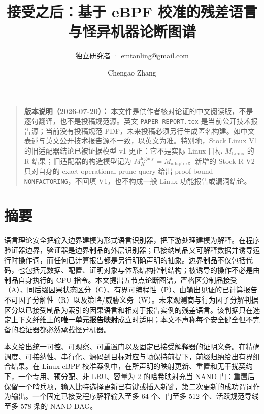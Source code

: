\documentclass[
  11pt,
  a4paper,
]{ctexart}
\title{接受之后：基于 eBPF 校准的残差语言与怪异机器论断图谱}
\subtitle{独立研究者 · emtanling@gmail.com}
\author{Chengao Zhang}
\date{}
\begin{document}
\maketitle
{}

\begin{quote}
\textbf{版本说明（2026-07-20）：}
本文件是供作者核对论证的中文阅读版，不是逐句翻译，也不是投稿规范源。英文
\texttt{PAPER\_REPORT.tex} 是当前公开技术报告源；当前没有投稿规范
PDF，未来投稿必须另行生成匿名构建。如中文表述与英文公开技术报告源不一致，以英文为准。特别地，Stock
Linux V1 的旧适配器结论已被证据模型 v1 更正：它不是实际 Linux 目标
\(M_{\mathrm{Linux}}\) 的 R 结果；旧适配器的构造模型记为
\(M_K^{\mathrm{legacy}}=M_{\mathrm{adapter}}\)。新增的 Stock-R V2
只对自身的 exact operational-prune query 给出 proof-bound
\texttt{NONFACTORING}，不回填 V1，也不构成一般 Linux
功能报告或漏洞结论。
\end{quote}

\hypertarget{ux6458ux8981}{%
\section{摘要}\label{ux6458ux8981}}

语言理论安全把输入边界建模为形式语言识别器，把下游处理建模为解释。在程序验证器边界，验证器是边界制品的外层识别器；已接纳制品又可解释数据并诱导运行时操作词，而任何已计算报告都是另行明确声明的抽象。边界制品不仅包括代码，也包括元数据、配置、证明对象与体系结构控制结构；被诱导的操作不必是由制品自身执行的
CPU
指令。本文提出五节点论断图谱，严格区分制品接受（A）、同后缀因果状态区分（C）、有界可编程性（P）、由输出见证的已计算报告不可因子分解性（R）以及策略/威胁义务（W）。未来观测商与行为因子分解判据区分以已接受制品为索引的因果语言和相对于报告实例的残差语言。该判据只在选定上下文纤维上的\textbf{唯一单元报告映射}成立时适用；本文不声称每个安全健全但不完备的验证器都必然承载怪异机器。

本文给出统一可控、可观察、可重置门以及固定已接受解释器的证明义务。在精确调度、可接纳性、串行化、源码到目标对应与帧保持前提下，前缀归纳给出有界组合结果。在
Linux eBPF
校准案例中，在所声明的映射更新、重置和无干扰契约下，一个专用、预分配、非
LRU、容量为 2 的哈希映射充当 NAND
门：重置后保留一个哨兵项，输入比特选择更新已有键或插入新键，第二次更新的成功谓词作为输出。一个固定已接受程序解释输入至多
64 个、门至多 512 个、活跃规范导线至多 578 条的 NAND DAG。
\end{document}
